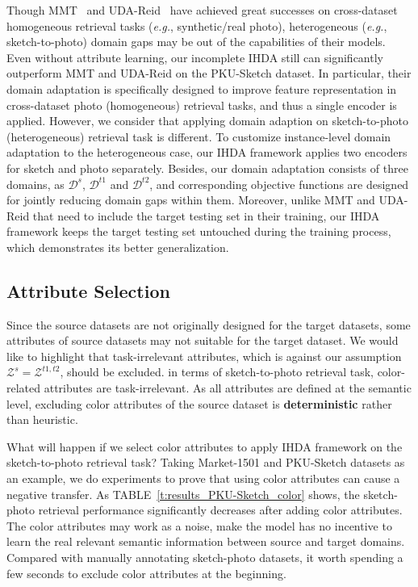 \documentclass[journal]{IEEEtran}
\begin{document}
Though MMT~\cite{ge2020mutual} and UDA-Reid~\cite{song2020unsupervised} have achieved great successes on cross-dataset homogeneous retrieval tasks (\textit{e.g.}, synthetic/real photo), heterogeneous (\textit{e.g.}, sketch-to-photo) domain gaps may be out of the capabilities of their models. Even without attribute learning, our incomplete IHDA still can significantly outperform MMT and UDA-Reid on the PKU-Sketch dataset. In particular, their domain adaptation is specifically designed to improve feature representation in cross-dataset photo (homogeneous) retrieval tasks, and thus a single encoder is applied. However, we consider that applying domain adaption on sketch-to-photo (heterogeneous) retrieval task is different. To customize instance-level domain adaptation to the heterogeneous case, our IHDA framework applies two encoders for sketch and photo separately. Besides, our domain adaptation consists of three domains, as $\mathcal{D}^{s}$, $\mathcal{D}^{t1}$ and $\mathcal{D}^{t2}$, and corresponding objective functions are designed for jointly reducing domain gaps within them. Moreover, unlike MMT and UDA-Reid that need to include the target testing set in their training, our IHDA framework keeps the target testing set untouched during the training process, which demonstrates its better generalization.


\subsection{Attribute Selection}

Since the source datasets are not originally designed for the target datasets, some attributes of source datasets may not suitable for the target dataset. We would like to highlight that task-irrelevant attributes, which is against our assumption $\mathcal{Z}^{s}=\mathcal{Z}^{t1,t2}$, should be excluded. in terms of sketch-to-photo retrieval task, color-related attributes are task-irrelevant. As all attributes are defined at the semantic level, excluding color attributes of the source dataset is \textbf{deterministic} rather than heuristic.

What will happen if we select color attributes to apply IHDA framework on the sketch-to-photo retrieval task? Taking Market-1501 and PKU-Sketch datasets as an example, we do experiments to prove that using color attributes can cause a negative transfer. As TABLE~\ref{t:results_PKU-Sketch_color} shows, the sketch-photo retrieval performance significantly decreases after adding color attributes. The color attributes may work as a noise, make the model has no incentive to learn the real relevant semantic information between source and target domains. Compared with manually annotating sketch-photo datasets, it worth spending a few seconds to exclude color attributes at the beginning.
\end{document}

